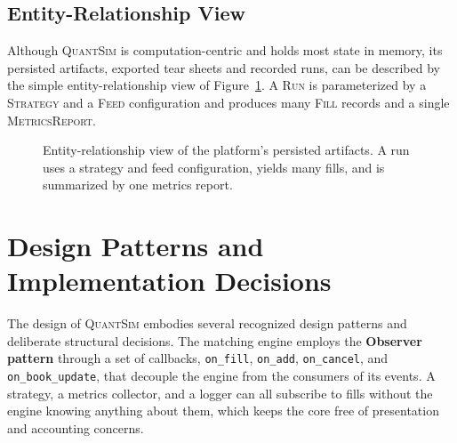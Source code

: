 \documentclass[12pt,oneside,a4paper]{report}
\newcommand{\quantsim}{\textsc{QuantSim}}
\begin{document}
\subsection{Entity-Relationship View}

Although \quantsim{} is computation-centric and holds most state in memory, its persisted artifacts, exported tear sheets and recorded runs, can be described by the simple entity-relationship view of Figure~\ref{fig:er}. A \textsc{Run} is parameterized by a \textsc{Strategy} and a \textsc{Feed} configuration and produces many \textsc{Fill} records and a single \textsc{MetricsReport}.

\begin{figure}[H]
\centering
{}
\caption[Entity-relationship view of the platform's persisted artifacts]{Entity-relationship view of the platform's persisted artifacts. A run uses a strategy and feed configuration, yields many fills, and is summarized by one metrics report.}
\label{fig:er}
\end{figure}

\section{Design Patterns and Implementation Decisions}
\label{sec:patterns}

The design of \quantsim{} embodies several recognized design patterns and deliberate structural decisions. The matching engine employs the \textbf{Observer pattern} through a set of callbacks, \texttt{on\_fill}, \texttt{on\_add}, \texttt{on\_cancel}, and \texttt{on\_book\_update}, that decouple the engine from the consumers of its events. A strategy, a metrics collector, and a logger can all subscribe to fills without the engine knowing anything about them, which keeps the core free of presentation and accounting concerns.
\end{document}
